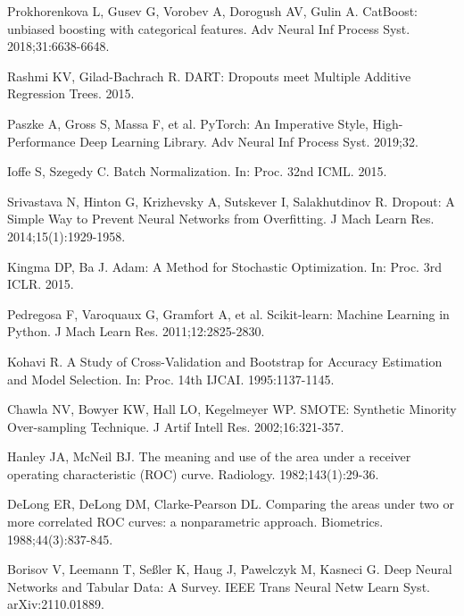\documentclass[twoside,11pt]{article}
\begin{document}
\begin{small}
\noindent [29] Prokhorenkova L, Gusev G, Vorobev A, Dorogush AV, Gulin A. CatBoost: unbiased boosting with categorical features. Adv Neural Inf Process Syst. 2018;31:6638-6648.

\noindent [30] Rashmi KV, Gilad-Bachrach R. DART: Dropouts meet Multiple Additive Regression Trees. 2015.

\noindent [31] Paszke A, Gross S, Massa F, et al. PyTorch: An Imperative Style, High-Performance Deep Learning Library. Adv Neural Inf Process Syst. 2019;32.

\noindent [32] Ioffe S, Szegedy C. Batch Normalization. In: Proc. 32nd ICML. 2015.

\noindent [33] Srivastava N, Hinton G, Krizhevsky A, Sutskever I, Salakhutdinov R. Dropout: A Simple Way to Prevent Neural Networks from Overfitting. J Mach Learn Res. 2014;15(1):1929-1958.

\noindent [34] Kingma DP, Ba J. Adam: A Method for Stochastic Optimization. In: Proc. 3rd ICLR. 2015.

\noindent [35] Pedregosa F, Varoquaux G, Gramfort A, et al. Scikit-learn: Machine Learning in Python. J Mach Learn Res. 2011;12:2825-2830.

\noindent [36] Kohavi R. A Study of Cross-Validation and Bootstrap for Accuracy Estimation and Model Selection. In: Proc. 14th IJCAI. 1995:1137-1145.

\noindent [37] Chawla NV, Bowyer KW, Hall LO, Kegelmeyer WP. SMOTE: Synthetic Minority Over-sampling Technique. J Artif Intell Res. 2002;16:321-357.

\noindent [38] Hanley JA, McNeil BJ. The meaning and use of the area under a receiver operating characteristic (ROC) curve. Radiology. 1982;143(1):29-36.

\noindent [39] DeLong ER, DeLong DM, Clarke-Pearson DL. Comparing the areas under two or more correlated ROC curves: a nonparametric approach. Biometrics. 1988;44(3):837-845.

\noindent [40] Borisov V, Leemann T, Seßler K, Haug J, Pawelczyk M, Kasneci G. Deep Neural Networks and Tabular Data: A Survey. IEEE Trans Neural Netw Learn Syst. arXiv:2110.01889.
\end{small}
\end{document}
